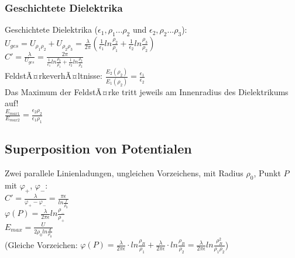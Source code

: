 \documentclass[a4paper,twoside,12pt]{report}
\begin{document}
\subsubsection{Geschichtete Dielektrika}
Geschichtete Dielektrika ($\epsilon_1, \rho_1 ...\rho_2$ und $\epsilon_2, \rho_2 ... \rho_3$):\\
$U_{ges} = U_{\rho_1\rho_2} + U_{\rho_2\rho_3} = \frac{\lambda}{2\pi}(\frac{1}{\epsilon_1}ln\frac{\rho_2}{\rho_1}+\frac{1}{\epsilon_2}ln\frac{\rho_3}{\rho_2})$ \\
$C' = \frac{\lambda}{U_{ges}} = \frac{2\pi}{\frac{1}{\epsilon_1}ln\frac{\rho_2}{\rho_1}+\frac{1}{\epsilon_2}ln\frac{\rho_3}{\rho_2}}$\\
FeldstÃ¤rkeverhÃ¤ltnisse:
$\frac{E_2(\rho_2)}{E_1(\rho_2)} = \frac{\epsilon_1}{\epsilon_2}$\\
Das Maximum der FeldstÃ¤rke tritt jeweils am Innenradius des Dielektrikums auf!\\
$\frac{E_{max1}}{E_{max2}}=\frac{\epsilon_2 \rho_2}{\epsilon_1 \rho_1}$\\

\subsection{Superposition von Potentialen}
Zwei parallele Linienladungen, ungleichen Vorzeichens, mit Radius $\rho_0$, Punkt $P$ mit $\varphi_+$, $\varphi_-$:\\
$C' = \frac{\lambda}{\varphi_+ - \varphi_-} = \frac{\pi\epsilon}{ln\frac{f}{\rho_0}}$\\
$\varphi(P) = \frac{\lambda}{2\pi\epsilon}ln\frac{\rho_-}{\rho_+}$\\
$E_{max} = \frac{U}{2\rho_0 ln\frac{d}{\rho_0}}$\\
(Gleiche Vorzeichen: $\varphi(P) = \frac{\lambda}{2\pi \epsilon}\cdot ln\frac{\rho_B}{\rho_1} + \frac{\lambda}{2\pi\epsilon}\cdot ln\frac{\rho_B}{\rho_2} =  \frac{\lambda}{2\pi\epsilon}ln\frac{\rho_B^2}{\rho_1\rho_2}$)\\
\end{document}
